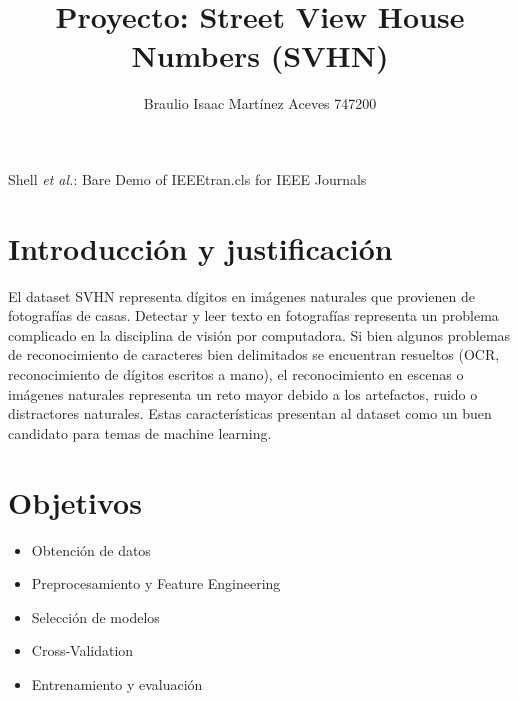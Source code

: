 \documentclass[journal]{IEEEtran}
\begin{document}
\title{Proyecto: Street View House Numbers (SVHN)}

\author {Braulio Isaac Martínez Aceves 747200
        }%
        
{Shell \MakeLowercase{\textit{et al.}}: Bare Demo of IEEEtran.cls for IEEE Journals}

\maketitle


\section{Introducción y justificación}

El dataset SVHN representa dígitos en imágenes naturales que provienen de fotografías de casas. Detectar y leer texto en fotografías representa un problema complicado en la disciplina de visión por computadora. Si bien algunos problemas de reconocimiento de caracteres bien delimitados se encuentran resueltos (OCR, reconocimiento de dígitos escritos a mano), el reconocimiento en escenas o imágenes naturales representa un reto mayor debido a los artefactos, ruido o distractores naturales.\cite{svhn} Estas características presentan al dataset como un buen candidato para temas de machine learning.

\section{Objetivos}
\begin{itemize}
        \item Obtención de datos
        \item Preprocesamiento y Feature Engineering
        \item Selección de modelos
        \item Cross-Validation
        \item Entrenamiento y evaluación
\end{itemize}
\end{document}
